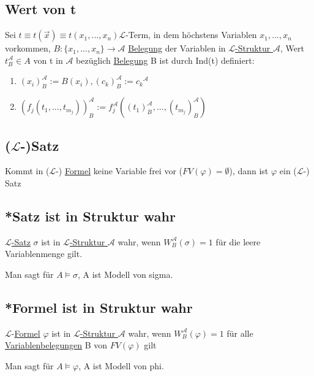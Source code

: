 \documentclass[12pt,a4paper]{article} %
\begin{document}
	\subsection{Wert von t}
	Sei $t \equiv t(\overrightarrow{x}) \equiv t(x_1, ..., x_n) \mathcal{L}$-Term, in dem höchstens Variablen $x_1, ..., x_n$ vorkommen, $B: \{x_1, ..., x_n\} \rightarrow \mathcal{A}$ \hyperref[Belegung]{Belegung} der Variablen in \hyperref[Struktur]{$\mathcal{L}$-Struktur $\mathcal{A}$}, Wert $t_B^{\mathcal{A}} \in A$ von t in $\mathcal{A}$ bezüglich \hyperref[Belegung]{Belegung} B ist durch Ind(t) definiert: 
	\begin{enumerate}
		\item $(x_i)_B^{\mathcal{A}} := B(x_i), (c_k)_B^{\mathcal{A}} := {c_k}^{\mathcal{A}}$
		\item $(f_j(t_1, ..., t_{m_j}))_B^{\mathcal{A}} := f_j^{\mathcal{A}}((t_1)_B^{\mathcal{A}}, ..., (t_{m_j})_B^{\mathcal{A}})$
	\end{enumerate}

	\subsection{($\mathcal{L}$-)Satz}
	\label{LSatz}
	Kommt in ($\mathcal{L}$-) \hyperref[Formel]{Formel} keine Variable frei vor ($FV(\varphi) = \emptyset$), dann ist $\varphi$ ein ($\mathcal{L}$-) Satz
	
	\subsection{*Satz ist in Struktur wahr}
	\hyperref[LSatz]{$\mathcal{L}$-Satz} $\sigma$ ist in \hyperref[Struktur]{$\mathcal{L}$-Struktur $\mathcal{A}$} wahr, wenn $W_B^{\mathcal{A}}(\sigma) = 1$ für die leere Variablenmenge gilt.
	
	Man sagt für $A \hyperref[Erfullbar]{\vDash} \sigma$, A ist Modell von sigma.
	
	\subsection{*Formel ist in Struktur wahr}
	$\mathcal{L}$-\hyperref[Formel]{Formel} $\varphi$ ist in \hyperref[Struktur]{$\mathcal{L}$-Struktur $\mathcal{A}$} wahr, wenn $W_B^{\mathcal{A}}(\varphi) = 1$ für alle \hyperref[Belegung]{Variablenbelegungen} B von $FV(\varphi)$ gilt
	
	Man sagt für $A \hyperref[Erfullbar]{\vDash} \varphi$, A ist Modell von phi.
	
\end{document}
